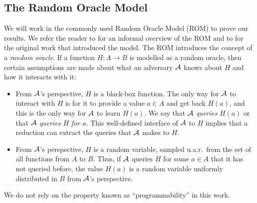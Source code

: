 \subsection{The Random Oracle Model} \label{sec:rom}

We will work in the commonly used Random Oracle Model (ROM) to prove our results. We refer the reader to \cite[Chapter 6.5]{introduction-to-modern-cryptography} for an informal overview of the ROM and to \cite{rom} for the original work that introduced the model. The ROM introduces the concept of a \emph{random oracle}. If a function $H : A \to B$ is modelled as a random oracle, then certain assumptions are made about what an adversary $\mathcal{A}$ knows about $H$ and how it interacts with it:
\begin{itemize}
	\item From $\mathcal{A}$'s perspective, $H$ is a black-box function. The only way for $\mathcal{A}$ to interact with $H$ is for it to provide a value $a \in A$ and get back $H(a)$, and this is the only way for $\mathcal{A}$ to learn $H(a)$. We say that $\mathcal{A}$ \emph{queries} $H(a)$ or that $\mathcal{A}$ \emph{queries $H$ for $a$}. This well-defined interface of $\mathcal{A}$ to $H$ implies that a reduction can extract the queries that $\mathcal{A}$ makes to $H$.
	\item From $\mathcal{A}$'s perspective, $H$ is a random variable, sampled u.a.r.\ from the set of all functions from $A$ to $B$. Thus, if $\mathcal{A}$ queries $H$ for some $a \in A$ that it has not queried before, the value $H(a)$ is a random variable uniformly distributed in $B$ from $\mathcal{A}$'s perspective.
\end{itemize}
We do not rely on the property known as ``programmability'' in this work.
